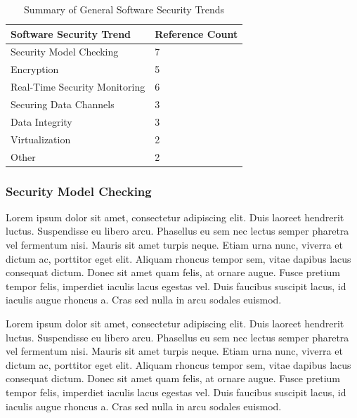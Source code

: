 \documentclass[final,conference,11pt]{IEEEtran}
\begin{document}
\begin{table}[!t]
\renewcommand{\arraystretch}{1.3}
\caption{Summary of General Software Security Trends}
\label{tab:trend_summary}
\centering
\begin{tabular}{ | l | l | }
\hline
 Software Security Trend & Reference Count \\ \hline
 Security Model Checking			& 7	\\ \hline
 Encryption						& 5	\\ \hline
 Real-Time Security Monitoring	& 6	\\ \hline
 Securing Data Channels			& 3	\\ \hline
 Data Integrity					& 3	\\ \hline
 Virtualization					& 2	\\ \hline	
 Other							& 2	\\ \hline
\end{tabular}
\end{table}

\subsubsection{Security Model Checking}

Lorem ipsum dolor sit amet, consectetur adipiscing elit. Duis laoreet hendrerit luctus. Suspendisse eu libero arcu. Phasellus eu sem nec lectus semper pharetra vel fermentum nisi. Mauris sit amet turpis neque. Etiam urna nunc, viverra et dictum ac, porttitor eget elit. Aliquam rhoncus tempor sem, vitae dapibus lacus consequat dictum. Donec sit amet quam felis, at ornare augue. Fusce pretium tempor felis, imperdiet iaculis lacus egestas vel. Duis faucibus suscipit lacus, id iaculis augue rhoncus a. Cras sed nulla in arcu sodales euismod.

Lorem ipsum dolor sit amet, consectetur adipiscing elit. Duis laoreet hendrerit luctus. Suspendisse eu libero arcu. Phasellus eu sem nec lectus semper pharetra vel fermentum nisi. Mauris sit amet turpis neque. Etiam urna nunc, viverra et dictum ac, porttitor eget elit. Aliquam rhoncus tempor sem, vitae dapibus lacus consequat dictum. Donec sit amet quam felis, at ornare augue. Fusce pretium tempor felis, imperdiet iaculis lacus egestas vel. Duis faucibus suscipit lacus, id iaculis augue rhoncus a. Cras sed nulla in arcu sodales euismod.
\end{document}
